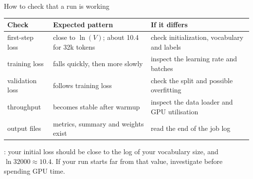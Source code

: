\documentclass[aspectratio=169,10pt]{beamer}
\begin{document}
\begin{frame}{How to check that a run is working}
  \centering
  \begin{tabular}{@{}L{3.4cm} L{3.4cm} L{4.0cm}@{}}
    \toprule
    \textbf{Check} & \textbf{Expected pattern} & \textbf{If it differs}\\
    \midrule
    first-step loss & close to $\ln(V)$; about 10.4 for 32k tokens &
      check initialization, vocabulary and labels\\[0.25em]
    training loss & falls quickly, then more slowly & inspect the learning rate
      and batches\\[0.25em]
    validation loss & follows training loss & check the split and possible
      overfitting\\[0.25em]
    throughput & becomes stable after warmup & inspect the data loader and GPU
      utilisation\\[0.25em]
    output files & metrics, summary and weights exist & read the end of the job
      log\\
    \bottomrule
  \end{tabular}

  \vspace{0.6em}
  \raggedright
  \small
  : your initial loss should be close to the log
  of your vocabulary size, and $\ln 32000 \approx 10.4$. If your run starts
  far from that value, investigate before spending GPU time.
\end{frame}
\end{document}
